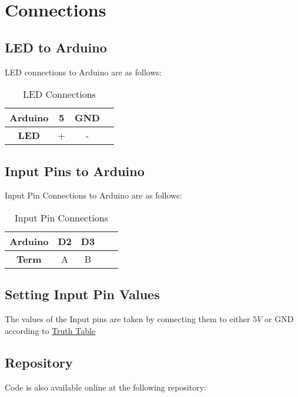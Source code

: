 \documentclass[a4paper,11pt]{article}
\newcommand\HSPC{\rule{0pt}{4ex}\rule[-2.0ex]{0pt}{0pt}}
\begin{document}
\newpage
\section{Connections}
    \subsection{LED to Arduino}
        LED connections to Arduino are as follows:
        \begin{table}[ht]
            \centering
            \begin{tabular}{|c |c |c |c |}
            \hline
                \textbf{Arduino} & 5 & GND \HSPC \\
            \hline
                \textbf{LED} & + & - \HSPC \\ 
            \hline
            \end{tabular}
            \caption{LED Connections}
            \label{tab:cnct_led}
        \end{table}
        
    \subsection{Input Pins to Arduino} {
        Input Pin Connections to Arduino are as follows:
        \begin{table}[ht]
            \centering
            \begin{tabular}{|c |c |c |c |c |}
            \hline
                \textbf{Arduino} & D2 & D3 \HSPC \\
            \hline
                \textbf{Term} & A & B  \HSPC \\
            \hline
            \end{tabular}
            \caption{Input Pin Connections}
            \label{tab:cnct_ip}
        \end{table}
    }
    
\subsection{Setting Input Pin Values}
        The values of the Input pins are taken by connecting them to either $5V$ or GND according to \hyperref[sec:ttf]{Truth Table}
\bigskip    

\subsection{Repository}
Code is also available online at the following repository:
\begin{center}
    \setlength{\fboxsep}{1em}
    
\end{center}
\end{document}
